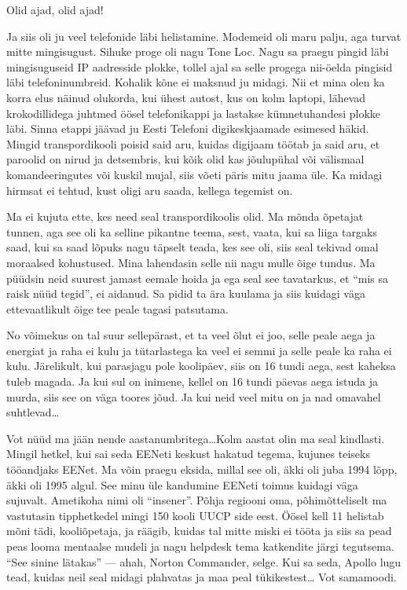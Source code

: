 Olid ajad, olid ajad!

Ja siis oli ju veel  telefonide läbi helistamine. Modemeid oli maru palju, aga turvat mitte mingisugust. Sihuke proge oli nagu Tone Loc. Nagu sa praegu pingid läbi mingisuguseid IP aadresside plokke, tollel ajal sa selle progega nii-öelda pingisid läbi telefoninumbreid.  Kohalik kõne ei maksnud ju midagi. Nii et mina olen ka korra elus näinud olukorda, kui  ühest autost, kus on kolm laptopi, lähevad krokodillidega juhtmed öösel telefonikappi ja  lastakse kümnetuhandesi plokke läbi. Sinna etappi jäävad ju Eesti Telefoni digikeskjaamade esimesed häkid. Mingid transpordikooli poisid said aru, kuidas digijaam töötab ja said aru, et paroolid on nirud ja detsembris, kui kõik olid kas jõulupühal või välismaal komandeeringutes või kuskil mujal, siis võeti päris mitu jaama üle. Ka midagi hirmsat ei tehtud, kust oligi aru saada, kellega tegemist on. 


Ma ei kujuta ette, kes need seal transpordikoolis olid. Ma mõnda õpetajat tunnen, aga see oli ka selline pikantne teema, sest, vaata, kui sa liiga targaks saad, kui sa saad lõpuks nagu täpselt teada, kes see oli, siis seal tekivad omal moraalsed kohustused. Mina lahendasin selle nii nagu mulle õige tundus. Ma püüdsin neid suurest jamast eemale hoida ja ega seal see tavatarkus, et \enquote{mis sa raisk nüüd tegid},  ei aidanud.  Sa pidid ta ära kuulama ja siis kuidagi väga ettevaatlikult õige tee peale tagasi patsutama. 


No võimekus on tal suur sellepärast, et ta veel õlut ei joo, selle peale aega ja energiat ja raha ei kulu ja tütarlastega ka veel ei semmi ja selle peale ka raha ei kulu. Järelikult, kui parasjagu pole koolipäev, siis on 16 tundi aega, sest kaheksa tuleb magada. Ja kui sul on inimene, kellel on 16 tundi päevas aega istuda ja murda, siis see on väga toores jõud. Ja kui neid veel mitu on ja nad omavahel suhtlevad\ldots


Vot nüüd ma jään nende aastanumbritega\ldots Kolm aastat olin ma seal kindlasti. Mingil hetkel, kui sai seda EENeti keskust hakatud tegema, kujunes teiseks tööandjaks EENet. Ma võin praegu eksida, millal see oli, äkki oli juba 1994 lõpp, äkki oli 1995 algul. See minu üle kandumine EENeti toimus kuidagi väga sujuvalt. Ametikoha nimi oli \enquote{insener}. Põhja regiooni oma, põhimõtteliselt ma vastutasin  tipphetkedel mingi 150 kooli UUCP side eest. Öösel kell 11 helistab mõni tädi,  kooliõpetaja, ja räägib, kuidas tal mitte miski ei tööta ja  siis sa pead peas looma mentaalse mudeli ja nagu helpdesk  tema katkendite järgi tegutsema. \enquote{See sinine lätakas} --- ahah, Norton Commander, selge. Kui sa seda, Apollo lugu tead, kuidas neil seal midagi plahvatas ja maa peal tükikestest\ldots {} Vot samamoodi. 

